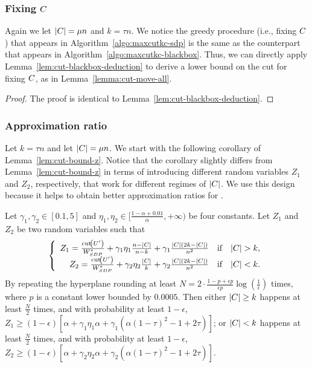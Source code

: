 \subsubsection{Fixing $C$}
\label{appendix:mc-proofs:sdp:fix-c}
Again we let $\lvert C\rvert = \mu n$ and $k = \tau n$. 
We notice the greedy procedure (i.e., fixing $C$) that appears in Algorithm~\ref{algo:maxcutkc-sdp} is the same as the counterpart that appears in Algorithm~\ref{algo:maxcutkc-blackbox}.
Thus, we can directly apply Lemma~\ref{lem:cut-blackbox-deduction} to derive a lower bound on the cut for fixing $C$, as in Lemma~\ref{lemma:cut-move-all}.

\cutmoveall*

\begin{proof}
	The proof is identical to Lemma~\ref{lem:cut-blackbox-deduction}. 
\end{proof}

\subsubsection{Approximation ratio}
\label{appendix:mc-proofs:sdp:approx}
Let $k = \tau n$ and let $\lvert C\rvert = \mu n$. We start with the following corollary of Lemma~\ref{lem:cut-bound-z}.
Notice that the corollary slightly differs from Lemma~\ref{lem:cut-bound-z} in
terms of introducing different random variables $Z_1$ and $Z_2$, respectively, that work for different regimes of $\lvert C\rvert$. We use this design because it helps to obtain better approximation ratios for \maxcutkc. 

\begin{corollary}
	\label{cor:cut-bound-z-two-case}
	Let $\gamma_1, \gamma_2 \in [0.1, 5]$ and $\eta_1, \eta_2 \in [\frac{1-\alpha+0.01}{\alpha}, +\infty)$ be four constants. 
	Let $Z_1$ and $Z_2$ be two random variables such that 
	\begin{displaymath}
		\left\{ \begin{array}{rcl}
Z_1 = \frac{\cut{\TempSet}}{W^*_{SDP}} + \gamma_1 \eta_1 \frac{n-\abs{\SelectSet}}{n-k} + \gamma_1 \frac{\abs{\SelectSet}(2k - \abs{\SelectSet})}{n^2} & \mbox{if} & \abs{\SelectSet} > k, \\ 
Z_2 = \frac{\cut{\TempSet}}{W^*_{SDP}} + \gamma_2 \eta_2 \frac{\abs{\SelectSet}}{k} + \gamma_2 \frac{\abs{\SelectSet}(2k - \abs{\SelectSet})}{n^2} & \mbox{if} & \abs{\SelectSet} <k.
\end{array}\right.
	\end{displaymath}
	By repeating the hyperplane rounding at least $N = 2\cdot\frac{1 - p + \epsilon p}{\epsilon p} \log(\frac{1}{\epsilon})$ times, where $p$ is a constant lower bounded by $0.0005$. 
	Then either $\lvert C\rvert \geq k$ happens at least $\frac{N}{2}$ times, and with probability at least $1 - \epsilon$, $Z_1 \geq (1-\epsilon) [\alpha + \gamma_1 \eta_1 \alpha + \gamma_1 (\alpha (1 - \tau)^2 - 1 + 2\tau)]$; 
	or $\lvert C\rvert < k$ happens at least $\frac{N}{2}$ times, and with probability at least $1 - \epsilon$, $Z_2 \geq (1-\epsilon) [\alpha + \gamma_2 \eta_2 \alpha + \gamma_2 (\alpha (1 - \tau)^2 - 1 + 2\tau)]$.
\end{corollary}


